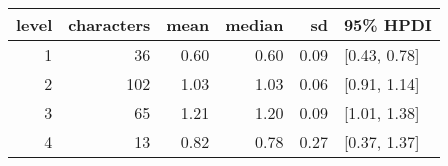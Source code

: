 
\begin{tabular}[t]{rrrrrl}
\toprule
level & characters & mean & median & sd & 95\% HPDI\\
\midrule
1 & 36 & 0.60 & 0.60 & 0.09 & {}[0.43, 0.78]\\
2 & 102 & 1.03 & 1.03 & 0.06 & {}[0.91, 1.14]\\
3 & 65 & 1.21 & 1.20 & 0.09 & {}[1.01, 1.38]\\
4 & 13 & 0.82 & 0.78 & 0.27 & {}[0.37, 1.37]\\
\bottomrule
\end{tabular}
